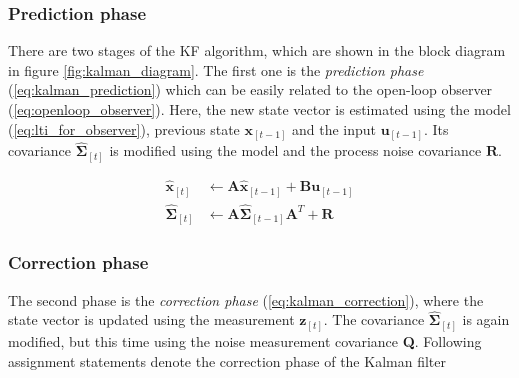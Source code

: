 \subsubsection{Prediction phase}

There are two stages of the KF algorithm, which are shown in the block diagram in figure \ref{fig:kalman_diagram}. The first one is the \textit{prediction phase} (\ref{eq:kalman_prediction}) which can be easily related to the open-loop observer (\ref{eq:openloop_observer}). Here, the new state vector is estimated using the model (\ref{eq:lti_for_observer}), previous state $\textbf{\^x}_{[t-1]}$ and the input $\textbf{u}_{[t-1]}$. Its covariance $\hat{\boldsymbol{\Sigma}}_{[t]}$ is modified using the model and the process noise covariance $\textbf{R}$.

\begin{equation}
\begin{split}
\hat{\textbf{x}}_{[t]} &\leftarrow \textbf{A}\hat{\textbf{x}}_{[t-1]} + \textbf{B}\textbf{u}_{[t-1]} \\
\hat{\boldsymbol{\Sigma}}_{[t]} &\leftarrow \textbf{A}\hat{\boldsymbol{\Sigma}}_{[t-1]}\textbf{A}^{T} + \textbf{R}
\end{split}
\label{eq:kalman_prediction}
\end{equation}    

\subsubsection{Correction phase}
The second phase is the \textit{correction phase} (\ref{eq:kalman_correction}), where the state vector is updated using the measurement $\textbf{z}_{[t]}$. The covariance $\hat{\boldsymbol{\Sigma}}_{[t]}$ is again modified, but this time using the noise measurement covariance \textbf{Q}. Following assignment statements denote the correction phase of the Kalman filter

